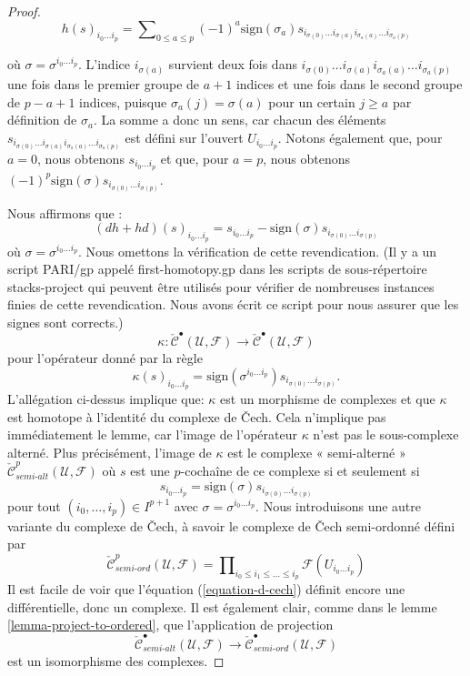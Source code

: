 \begin{proof}
\begin{equation}
\label{equation-first-homotopy}
h(s)_{i_0\ldots i_p} =
\sum\nolimits_{0 \leq a \leq p}
(-1)^a \text{sign}(\sigma_a)
s_{i_{\sigma(0)} \ldots i_{\sigma(a)} i_{\sigma_a(a)} \ldots i_{\sigma_a(p)}}
\end{equation}

où $\sigma = \sigma^{i_0 \ldots i_p}$. L'indice
$i_{\sigma(a)}$ survient deux fois dans
$i_{\sigma(0)} \ldots i_{\sigma(a)} i_{\sigma_a(a)} \ldots i_{\sigma_a(p)}$
une fois dans le premier groupe de $a + 1$ indices et une fois dans le second groupe de $p - a + 1$ indices, puisque $\sigma_a(j) = \sigma(a)$ pour un certain
$j \geq a$ par définition de $\sigma_a$. La somme a donc un sens, car chacun des éléments
$s_{i_{\sigma(0)} \ldots i_{\sigma(a)} i_{\sigma_a(a)} \ldots i_{\sigma_a(p)}}$
est défini sur l'ouvert $U_{i_0 \ldots i_p}$. Notons également que, pour $a = 0$, nous obtenons $s_{i_0 \ldots i_p}$ et que, pour $a = p$, nous obtenons
$(-1)^p \text{sign}(\sigma) s_{i_{\sigma(0)} \ldots i_{\sigma(p)}}$.

\medskip\noindent

Nous affirmons que :
$$
(dh + hd)(s)_{i_0 \ldots i_p} =
s_{i_0 \ldots i_p} -
\text{sign}(\sigma) s_{i_{\sigma(0)} \ldots i_{\sigma(p)}}
$$
où $\sigma = \sigma^{i_0 \ldots i_p}$. Nous omettons la vérification de cette revendication. (Il y a un script PARI/gp appelé first-homotopy.gp dans les scripts de sous-répertoire stacks-project qui peuvent être utilisés pour vérifier de nombreuses instances finies de cette revendication. Nous avons écrit ce script pour nous assurer que les signes sont corrects.)
$$
\kappa :
\check{\mathcal{C}}^\bullet(\mathcal{U}, \mathcal{F})
\longrightarrow
\check{\mathcal{C}}^\bullet(\mathcal{U}, \mathcal{F})
$$
pour l'opérateur donné par la règle
$$
\kappa(s)_{i_0 \ldots i_p} =
\text{sign}(\sigma^{i_0 \ldots i_p}) s_{i_{\sigma(0)} \ldots i_{\sigma(p)}}.
$$
L'allégation ci-dessus implique que: $\kappa$ est un morphisme de complexes et que
$\kappa$ est homotope à l'identité du complexe de {\v C}ech. Cela n'implique pas immédiatement le lemme, car l'image de l'opérateur $\kappa$ n'est pas le sous-complexe alterné. Plus précisément, l'image de $\kappa$ est le complexe « semi-alterné »
$\check{\mathcal{C}}_{semi\text{-}alt}^p(\mathcal{U}, \mathcal{F})$
où $s$ est une $p$-cochaîne de ce complexe si et seulement si
$$
s_{i_0 \ldots i_p} = \text{sign}(\sigma) s_{i_{\sigma(0)} \ldots i_{\sigma(p)}}
$$
pour tout $(i_0, \ldots, i_p) \in I^{p + 1}$ avec
$\sigma = \sigma^{i_0 \ldots i_p}$. Nous introduisons une autre variante du complexe de {\v C}ech, à savoir le complexe de {\v C}ech semi-ordonné défini par
$$
\check{\mathcal{C}}_{semi\text{-}ord}^p(\mathcal{U}, \mathcal{F})
=
\prod\nolimits_{i_0 \leq i_1 \leq \ldots \leq i_p}
\mathcal{F}(U_{i_0 \ldots i_p})
$$
Il est facile de voir que l'équation (\ref{equation-d-cech}) définit encore une différentielle, donc un complexe. Il est également clair, comme dans le lemme \ref{lemma-project-to-ordered}, que l'application de projection
$$
\check{\mathcal{C}}_{semi\text{-}alt}^\bullet(\mathcal{U}, \mathcal{F})
\longrightarrow
\check{\mathcal{C}}_{semi\text{-}ord}^\bullet(\mathcal{U}, \mathcal{F})
$$
est un isomorphisme des complexes.


\end{proof}
